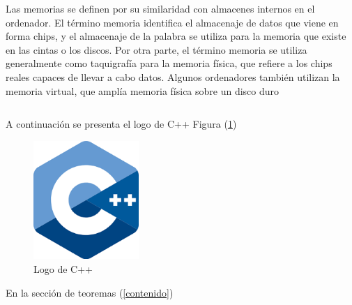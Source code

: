 \documentclass{article}
\begin{document}
Las memorias se definen por su similaridad con almacenes internos en el ordenador. El término memoria identifica el almacenaje de datos que viene en forma chips, y el almacenaje de la palabra se utiliza para la memoria que existe en las cintas o los discos. Por otra parte, el término memoria se utiliza generalmente como taquigrafía para la memoria física, que refiere a los chips reales capaces de llevar a cabo datos. Algunos ordenadores también utilizan la memoria virtual, que amplía memoria física sobre un disco duro
\begin{lstlisting}

\end{lstlisting}

A continuación se presenta el logo de C++ Figura (\ref{fig:cpplogo})

\begin{figure}[h]
\includegraphics[width=4cm]{cpplogo.png}
\centering
\caption{Logo de C++}
\label{fig:cpplogo}
\end{figure}

En la sección de teoremas (\ref{contenido})



 

\end{document}
